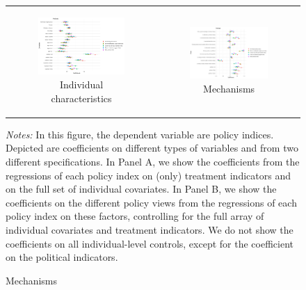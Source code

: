 \documentclass{article}
\begin{document}
\begin{figure}[h!]
\begin{center}
	\caption{Decomposing Tax Policy Views}
	\setlength\extrarowheight{-1pt}
	\begin{tabular}{cc}
		\begin{subfigure}{0.5\textwidth}
		\caption{Individual characteristics}
			\includegraphics[width=\textwidth]{coef_policy_views_all}
		\end{subfigure}&
		\begin{subfigure}{0.5\textwidth}
		\caption{Mechanisms}
			\includegraphics[width=\textwidth]{coef_policy_views_indexes_all}
		\end{subfigure}\\
	\end{tabular}
\end{center}

{\footnotesize \textit{Notes:} In this figure, the dependent variable are policy indices. Depicted are coefficients on different types of variables and from two different specifications. In Panel A, we show the coefficients from the regressions of each policy index on (only) treatment indicators and on the full set of individual covariates. In Panel B, we show the coefficients on the different policy views from the regressions of each policy index on these factors, controlling for the full array of individual covariates and treatment indicators. We do not show the coefficients on all individual-level controls, except for the coefficient on the political indicators.}
\end{figure}
\end{document}
